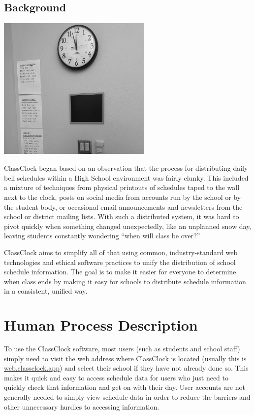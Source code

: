 \documentclass{article}
\begin{document}
\subsection{Background}

\begin{center}
\includegraphics[width=2.9547in,height=2.7646in]{images/graywallclock.jpg}
\end{center}

{ClassClock began based on an observation that the process for distributing daily bell schedules within a High School
environment was fairly clunky. This included a mixture of techniques from physical printouts of schedules taped to the
wall next to the clock, posts on social media from accounts run by the school or by the student body, or occasional
email announcements and newsletters from the school or district mailing lists. With such a distributed system, it was
hard to pivot quickly when something changed unexpectedly, like an unplanned snow day, leaving students constantly
wondering “when will class be over?”}


{ClassClock aims to simplify all of that using common, industry-standard web technologies and ethical software practices
to unify the distribution of school schedule information. The goal is to make it easier for everyone to determine when
class ends by making it easy for schools to distribute schedule information in a consistent, unified way.}

\section{Human Process Description}
{To use the ClassClock software, most users (such as students and school staff) simply need to visit the web address
where ClassClock is located (usually this is \href{https://web.classclock.app}{web.classclock.app}) and select their school if they have not
already done so. This makes it quick and easy to access schedule data for users who just need to quickly check that
information and get on with their day. User accounts are not generally needed to simply view schedule data in order to
reduce the barriers and other unnecessary hurdles to accessing information.}
\end{document}
